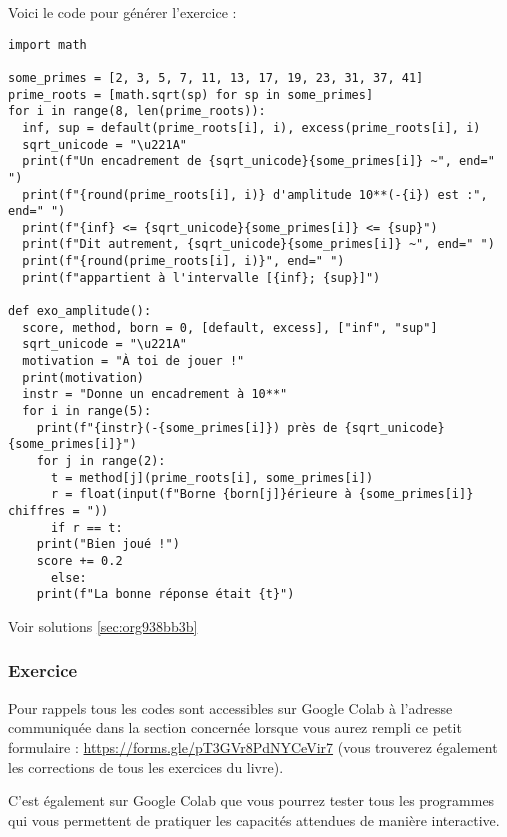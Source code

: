 \documentclass[a4paper, 11pt, twoside]{article}
\begin{document}
Voici le code pour générer l'exercice :
\begin{verbatim}
import math

some_primes = [2, 3, 5, 7, 11, 13, 17, 19, 23, 31, 37, 41]
prime_roots = [math.sqrt(sp) for sp in some_primes]
for i in range(8, len(prime_roots)):
  inf, sup = default(prime_roots[i], i), excess(prime_roots[i], i)
  sqrt_unicode = "\u221A"
  print(f"Un encadrement de {sqrt_unicode}{some_primes[i]} ~", end=" ")
  print(f"{round(prime_roots[i], i)} d'amplitude 10**(-{i}) est :", end=" ")
  print(f"{inf} <= {sqrt_unicode}{some_primes[i]} <= {sup}")
  print(f"Dit autrement, {sqrt_unicode}{some_primes[i]} ~", end=" ")
  print(f"{round(prime_roots[i], i)}", end=" ")
  print(f"appartient à l'intervalle [{inf}; {sup}]")

def exo_amplitude():
  score, method, born = 0, [default, excess], ["inf", "sup"]
  sqrt_unicode = "\u221A"
  motivation = "À toi de jouer !"
  print(motivation)
  instr = "Donne un encadrement à 10**"
  for i in range(5):
    print(f"{instr}(-{some_primes[i]}) près de {sqrt_unicode}{some_primes[i]}")
    for j in range(2):
      t = method[j](prime_roots[i], some_primes[i])
      r = float(input(f"Borne {born[j]}érieure à {some_primes[i]} chiffres = "))
      if r == t:
	print("Bien joué !")
	score += 0.2
      else:
	print(f"La bonne réponse était {t}")
\end{verbatim}

Voir solutions \ref{sec:org938bb3b}

\subsubsection{Exercice}
\label{sec:org03939ae}
Pour rappels tous les codes sont accessibles sur Google Colab à
l'adresse communiquée dans la section concernée lorsque vous
aurez rempli ce petit formulaire :
\url{https://forms.gle/pT3GVr8PdNYCeVir7} (vous trouverez également
les corrections de tous les exercices du livre).

C'est également sur Google Colab que vous pourrez tester tous les
programmes qui vous permettent de pratiquer les capacités attendues
de manière interactive.
\end{document}
